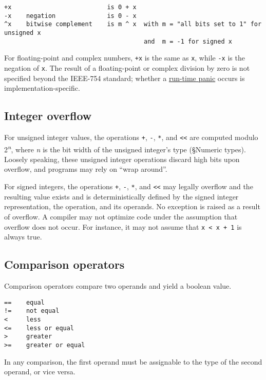 {\begin{Verbatim}[frame=single]
+x                          is 0 + x
-x    negation              is 0 - x
^x    bitwise complement    is m ^ x  with m = "all bits set to 1" for unsigned x
                                      and  m = -1 for signed x
\end{Verbatim}

For floating-point and complex numbers, \texttt{+x} is the same as
\texttt{x}, while \texttt{-x} is the negation of \texttt{x}. The result
of a floating-point or complex division by zero is not specified beyond
the IEEE-754 standard; whether a \hyperref[Run\_time\_panics]{run-time
panic} occurs is implementation-specific.

\subsection*{Integer overflow}

For unsigned integer values, the operations \texttt{+}, \texttt{-},
\texttt{*}, and \texttt{\textless{}\textless{}} are computed modulo
2\textsuperscript{\emph{n}}, where \emph{n} is the bit width of the
unsigned integer's type (§Numeric types).
Loosely speaking, these unsigned integer operations discard high bits
upon overflow, and programs may rely on ``wrap around''.

For signed integers, the operations \texttt{+}, \texttt{-}, \texttt{*},
and \texttt{\textless{}\textless{}} may legally overflow and the
resulting value exists and is deterministically defined by the signed
integer representation, the operation, and its operands. No exception is
raised as a result of overflow. A compiler may not optimize code under
the assumption that overflow does not occur. For instance, it may not
assume that \texttt{x \textless{} x + 1} is always true.

\subsection*{Comparison operators}

Comparison operators compare two operands and yield a boolean value.

\begin{Verbatim}[frame=single]
==    equal
!=    not equal
<     less
<=    less or equal
>     greater
>=    greater or equal
\end{Verbatim}

In any comparison, the first operand must be
assignable to the type of the second operand,
or vice versa.

}
